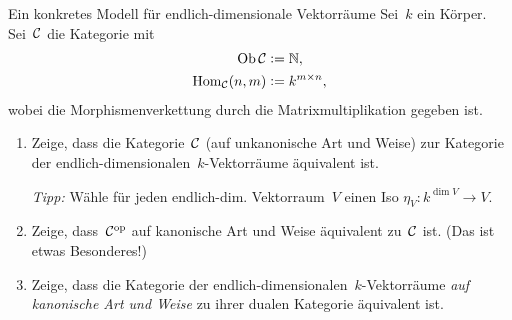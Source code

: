 \documentclass{uebblatt}
\begin{document}

\begin{aufgabe}{Ein konkretes Modell für endlich-dimensionale Vektorräume}
Sei~$k$ ein Körper. Sei~$\mathcal{C}$ die Kategorie mit
\begin{align*}
  \operatorname{Ob} \mathcal{C} &\vcentcolon= \mathbb{N}, \\
  \mathrm{Hom}_{\mathcal{C}}(n, m) &\vcentcolon= k^{m \times n},
\end{align*}
wobei die Morphismenverkettung durch die Matrixmultiplikation gegeben ist.
\begin{enumerate}
\item Zeige, dass die Kategorie~$\mathcal{C}$ (auf unkanonische Art und Weise) zur Kategorie der
endlich-dimensionalen~$k$-Vektorräume äquivalent ist.

{\tiny
\emph{Tipp:} Wähle für jeden endlich-dim. Vektorraum~$V$ einen Iso
$\eta_V : k^{\dim V} \to V$.\par}
\item Zeige, dass~$\mathcal{C}^{\mathrm{op}}$ auf kanonische Art und Weise äquivalent zu~$\mathcal{C}$ ist. (Das ist etwas
Besonderes!)
\item Zeige, dass die Kategorie der endlich-dimensionalen~$k$-Vektorräume
\emph{auf kanonische Art und Weise} zu ihrer dualen Kategorie äquivalent ist.
\end{enumerate}
\end{aufgabe}
\end{document}
